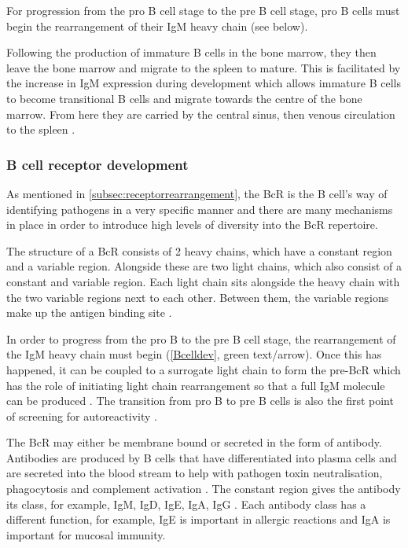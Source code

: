 For progression from the pro B cell stage to the pre B cell stage, pro B cells must begin the rearrangement of their IgM heavy chain (see below).

Following the production of immature B cells in the bone marrow, they then leave the bone marrow and migrate to the spleen to mature.
This is facilitated by the increase in IgM expression during development which allows immature B cells to become transitional B cells and migrate towards the centre of the bone marrow. 
From here they are carried by the central sinus, then venous circulation to the spleen \citep{Loder1999}.


\subsubsection{B cell receptor development}
\label{subsubsec:Bcellrecepdevelopment}

As mentioned in \cref{subsec:receptorrearrangement}, the BcR is the B cell's way of identifying pathogens in a very specific manner and there are many mechanisms in place in order to introduce high levels of diversity into the BcR repertoire.

The structure of a BcR consists of 2 heavy chains, which have a constant region and a variable region.
Alongside these are two light chains, which also consist of a constant and variable region.
Each light chain sits alongside the heavy chain with the two variable regions next to each other.
Between them, the variable regions make up the antigen binding site \citep{Pieper2013}.


In order to progress from the pro B to the pre B cell stage, the rearrangement of the IgM heavy chain must begin (\cref{Bcelldev}, green text/arrow).
Once this has happened, it can be coupled to a surrogate light chain to form the pre-BcR which has the role of initiating light chain rearrangement so that a full IgM molecule can be produced \citep{Burrows2002}.
The transition from pro B to pre B cells is also the first point of screening for autoreactivity \citep{Pieper2013}.

The BcR may either be membrane bound or secreted in the form of antibody.
Antibodies are produced by B cells that have differentiated into plasma cells and are secreted into the blood stream to help with pathogen toxin neutralisation, phagocytosis and complement activation \citep{Janeway2008}.
The constant region gives the antibody its class, for example, IgM, IgD, IgE, IgA, IgG \citep{Pieper2013}.
Each antibody class has a different function, for example, IgE is important in allergic reactions and IgA is important for mucosal immunity.



